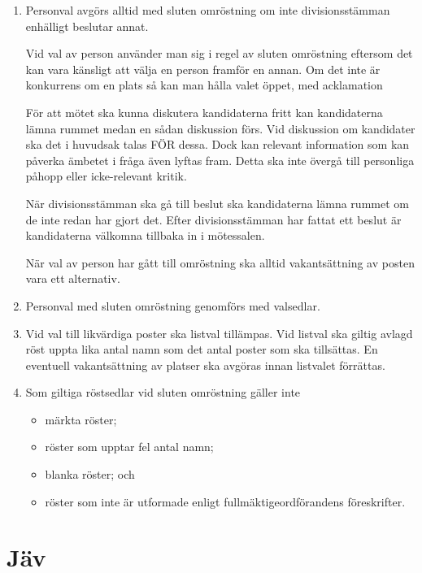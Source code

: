 \documentclass{dvd}
\begin{document}
	\begin{enumerate}[label=\arabic* §, ref=\arabic*]
		\item Personval avgörs alltid med sluten omröstning om inte divisionsstämman enhälligt beslutar annat.

		Vid val av person använder man sig i regel av sluten omröstning eftersom det kan vara känsligt att välja en person framför en annan.
		Om det inte är konkurrens om en plats så kan man hålla valet öppet, med acklamation

		För att mötet ska kunna diskutera kandidaterna fritt kan kandidaterna lämna rummet medan en sådan diskussion förs.
		Vid diskussion om kandidater ska det i huvudsak talas FÖR dessa.
		Dock kan relevant information som kan påverka ämbetet i fråga även lyftas fram.
		Detta ska inte övergå till personliga påhopp eller icke-relevant kritik.

		När divisionsstämman ska gå till beslut ska kandidaterna lämna rummet om de inte redan har gjort det.
		Efter divisionsstämman har fattat ett beslut är kandidaterna välkomna tillbaka in i mötessalen.

		När val av person har gått till omröstning ska alltid vakantsättning av posten vara ett alternativ.

		\item Personval med sluten omröstning genomförs med valsedlar.

		\item Vid val till likvärdiga poster ska listval tillämpas.
		Vid listval ska giltig avlagd röst uppta lika antal namn som det antal poster som ska tillsättas.
		En eventuell vakantsättning av platser ska avgöras innan listvalet förrättas.

		\item Som giltiga röstsedlar vid sluten omröstning gäller inte

		\begin{itemize}
			\item märkta röster;
			\item röster som upptar fel antal namn;
			\item blanka röster; och
			\item röster som inte är utformade enligt fullmäktigeordförandens föreskrifter.
		\end{itemize}
	\end{enumerate}

	\section{Jäv}
\end{document}
